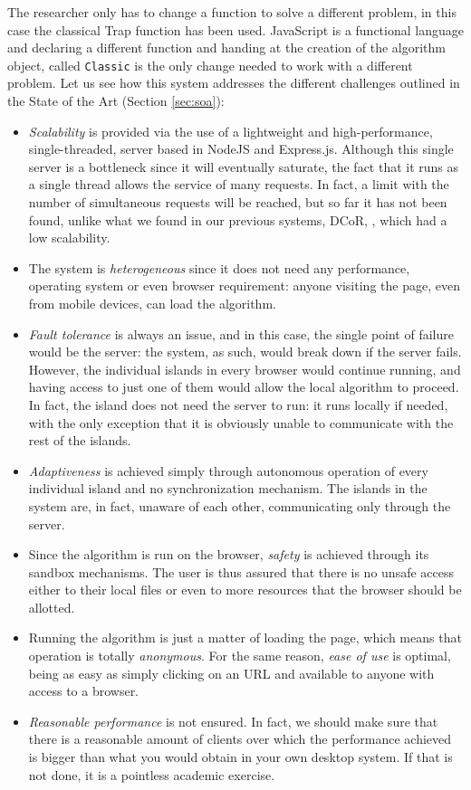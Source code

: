 \documentclass[journal,onecolumn]{IEEEtran}
\begin{document}
The researcher only has to change a function to solve a different
problem, in this case the classical Trap function \cite{Ackley1987} has been 
used. JavaScript is a functional language and declaring a different
function and handing at the creation of the algorithm object, called
{\tt Classic} is the only change needed to work with a different
problem. Let us see how this system addresses the different challenges
outlined in the State of the Art (Section \ref{sec:soa}):\begin{itemize}
\item {\em Scalability} is provided via the use of a lightweight and
  high-performance, single-threaded, server based in NodeJS and
  Express.js. Although this single server is a bottleneck since it
  will eventually saturate, the fact that it runs as a single thread
  allows the service of many requests. In fact, a limit with the
  number of simultaneous requests will be reached, but so far it has
  not been found, unlike what we found in our previous systems, DCoR,
  \cite{gecco07:workshop:dcor}, which had a low scalability.
\item The system is {\em heterogeneous} since it does not need any
  performance, operating system or even browser requirement: anyone
  visiting the page, even from mobile devices, can load the algorithm. 
\item {\em Fault tolerance} is always an issue, and in this case, the
  single point of failure would be the server: the system, as such,
  would break down if the server fails. However, the individual
  islands in every browser would continue running, and having access
  to just one of them would allow the local algorithm to proceed. In
  fact, the island does not need the server to run: it runs locally if
  needed, with the only exception that it is obviously unable to
  communicate with the rest of the islands.
\item {\em Adaptiveness} is achieved simply through autonomous
  operation of every individual island and no synchronization
  mechanism. The islands in the system are, in fact, unaware of each
  other, communicating only through the server.
\item Since the algorithm is run on the browser, {\em safety} is
  achieved through its sandbox mechanisms. The user is thus assured
  that there is no unsafe access either to their local files or even
  to more resources that the browser should be allotted.
\item Running the algorithm is just a matter of loading the page,
  which means that operation is totally {\em anonymous}. For the same
  reason, {\em ease of use} is optimal, being as easy as simply
  clicking on an URL and available to anyone with access to a browser.
\item {\em Reasonable performance} is not ensured. In fact, we should
  make sure that there is a reasonable amount of clients over which
  the performance achieved is bigger than what you would obtain in
  your own desktop system. If that is not done, it is a pointless
  academic exercise.
\end{itemize}
\end{document}
